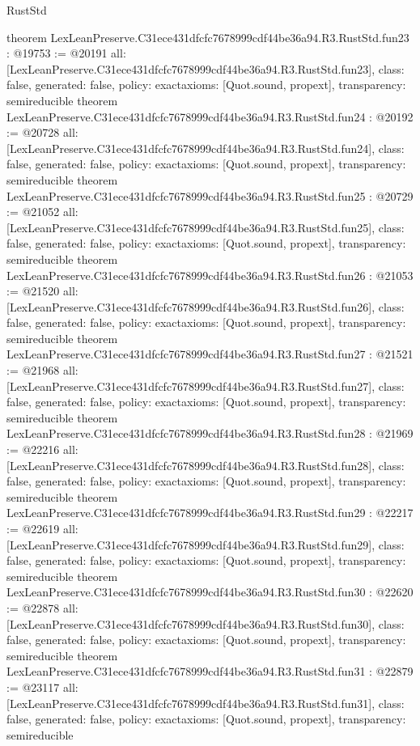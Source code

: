 \begin{lexlean}{RustStd}
\begin{coremodule}
{}
theorem LexLeanPreserve.C31ece431dfcfc7678999cdf44be36a94.R3.RustStd.fun23 : @19753 := @20191 {
  all: [LexLeanPreserve.C31ece431dfcfc7678999cdf44be36a94.R3.RustStd.fun23],
  class: false,
  generated: false,
  policy: exact{axioms: [Quot.sound, propext]},
  transparency: semireducible
}
theorem LexLeanPreserve.C31ece431dfcfc7678999cdf44be36a94.R3.RustStd.fun24 : @20192 := @20728 {
  all: [LexLeanPreserve.C31ece431dfcfc7678999cdf44be36a94.R3.RustStd.fun24],
  class: false,
  generated: false,
  policy: exact{axioms: [Quot.sound, propext]},
  transparency: semireducible
}
theorem LexLeanPreserve.C31ece431dfcfc7678999cdf44be36a94.R3.RustStd.fun25 : @20729 := @21052 {
  all: [LexLeanPreserve.C31ece431dfcfc7678999cdf44be36a94.R3.RustStd.fun25],
  class: false,
  generated: false,
  policy: exact{axioms: [Quot.sound, propext]},
  transparency: semireducible
}
theorem LexLeanPreserve.C31ece431dfcfc7678999cdf44be36a94.R3.RustStd.fun26 : @21053 := @21520 {
  all: [LexLeanPreserve.C31ece431dfcfc7678999cdf44be36a94.R3.RustStd.fun26],
  class: false,
  generated: false,
  policy: exact{axioms: [Quot.sound, propext]},
  transparency: semireducible
}
theorem LexLeanPreserve.C31ece431dfcfc7678999cdf44be36a94.R3.RustStd.fun27 : @21521 := @21968 {
  all: [LexLeanPreserve.C31ece431dfcfc7678999cdf44be36a94.R3.RustStd.fun27],
  class: false,
  generated: false,
  policy: exact{axioms: [Quot.sound, propext]},
  transparency: semireducible
}
theorem LexLeanPreserve.C31ece431dfcfc7678999cdf44be36a94.R3.RustStd.fun28 : @21969 := @22216 {
  all: [LexLeanPreserve.C31ece431dfcfc7678999cdf44be36a94.R3.RustStd.fun28],
  class: false,
  generated: false,
  policy: exact{axioms: [Quot.sound, propext]},
  transparency: semireducible
}
theorem LexLeanPreserve.C31ece431dfcfc7678999cdf44be36a94.R3.RustStd.fun29 : @22217 := @22619 {
  all: [LexLeanPreserve.C31ece431dfcfc7678999cdf44be36a94.R3.RustStd.fun29],
  class: false,
  generated: false,
  policy: exact{axioms: [Quot.sound, propext]},
  transparency: semireducible
}
theorem LexLeanPreserve.C31ece431dfcfc7678999cdf44be36a94.R3.RustStd.fun30 : @22620 := @22878 {
  all: [LexLeanPreserve.C31ece431dfcfc7678999cdf44be36a94.R3.RustStd.fun30],
  class: false,
  generated: false,
  policy: exact{axioms: [Quot.sound, propext]},
  transparency: semireducible
}
theorem LexLeanPreserve.C31ece431dfcfc7678999cdf44be36a94.R3.RustStd.fun31 : @22879 := @23117 {
  all: [LexLeanPreserve.C31ece431dfcfc7678999cdf44be36a94.R3.RustStd.fun31],
  class: false,
  generated: false,
  policy: exact{axioms: [Quot.sound, propext]},
  transparency: semireducible
}
\end{coremodule}
\end{lexlean}
